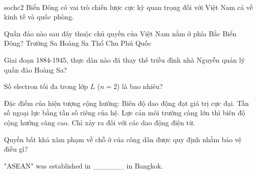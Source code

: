 \begin{ex}
    \\sochc{2}{
        Biển Đông có vai trò chiến lược cực kỳ quan trọng đối với Việt Nam cả về kinh tế và quốc phòng.
    }
    \begin{chc}
        Quần đảo nào sau đây thuộc chủ quyền của Việt Nam nằm ở phía Bắc Biển Đông?
        \choice
        {Trường Sa}
        {\True Hoàng Sa}
        {Thổ Chu}
        {Phú Quốc}
    \end{chc}
    \begin{chc}
        Giai đoạn 1884-1945, thực dân nào đã thay thế triều đình nhà Nguyễn quản lý quần đảo Hoàng Sa?
    \end{chc}
\end{ex}

\begin{ex}
    Số electron tối đa trong lớp $L$ ($n=2$) là bao nhiêu?
\end{ex}

\begin{ex}
    Đặc điểm của hiện tượng cộng hưởng:
    \choiceTF
    {\True Biên độ dao động đạt giá trị cực đại.}
    {\True Tần số ngoại lực bằng tần số riêng của hệ.}
    {Lực cản môi trường càng lớn thì biên độ cộng hưởng càng cao.}
    {Chỉ xảy ra đối với các dao động điện từ.}
\end{ex}

\begin{ex}
    Quyền bất khả xâm phạm về chỗ ở của công dân được quy định nhằm bảo vệ điều gì?
\end{ex}

\begin{ex}
    "ASEAN" was established in ______ in Bangkok.
\end{ex}

